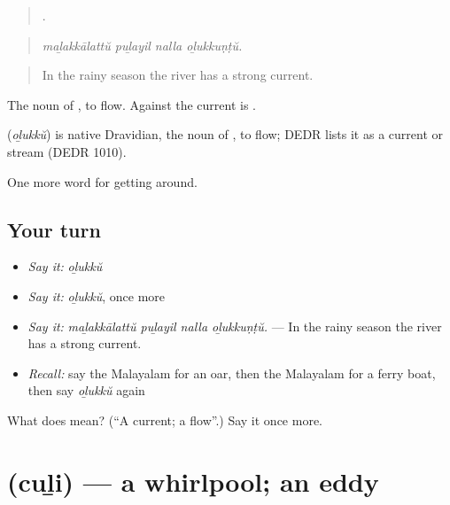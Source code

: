 \begin{quote}
   .
\end{quote}

\begin{quote}
\emph{maḻakkālattŭ puḻayil nalla oḻukkuṇṭŭ.}
\end{quote}

\begin{quote}
In the rainy season the river has a strong current.
\end{quote}

The noun of , to flow. Against the current is .

\begin{cousinweb}
\textbf{} (\emph{oḻukkŭ}) is native Dravidian, the noun of , to flow; DEDR lists it as a current or stream (DEDR 1010).
\end{cousinweb}

\begin{grammarlens}[title={What you've built}]
One more word for getting around.
\end{grammarlens}

\subsection*{Your turn}
\begin{itemize}
\raggedright
  \item \emph{Say it:} \emph{oḻukkŭ}
  \item \emph{Say it:} \emph{oḻukkŭ}, once more
  \item \emph{Say it:} \emph{maḻakkālattŭ puḻayil nalla oḻukkuṇṭŭ.} — In the rainy season the river has a strong current.
  \item \emph{Recall:} say the Malayalam for an oar, then the Malayalam for a ferry boat, then say \emph{oḻukkŭ} again
\end{itemize}

\begin{tcolorbox}[breakable,colback=teal!4,colframe=teal!35!black,title={Before you move on}]
What does  mean? (\textquotedblleft{}A current; a flow\textquotedblright{}.) Say it once more.
\end{tcolorbox}
\section[\texorpdfstring{\ml{ചുഴി} (cuḻi)}{ചുഴി (cuḻi)}]{ (cuḻi) — a whirlpool; an eddy}

